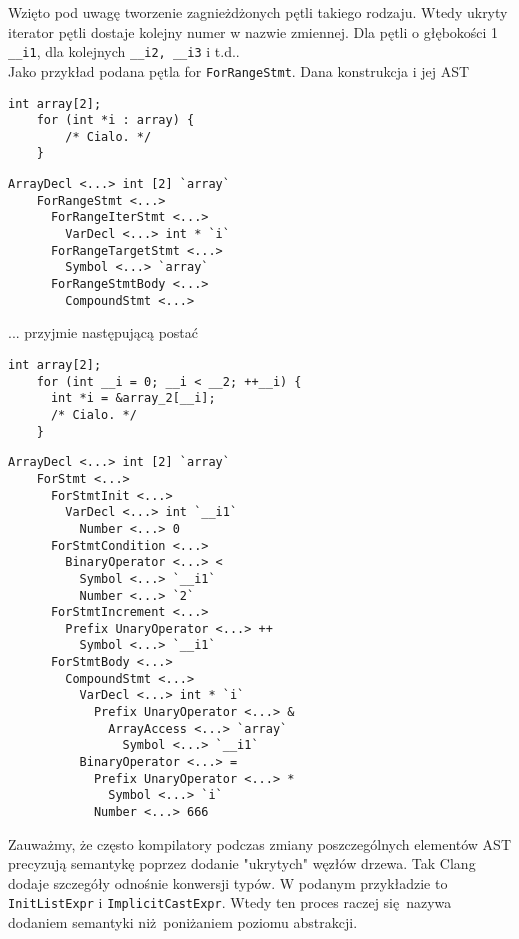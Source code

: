 			Wzięto pod uwagę tworzenie zagnieżdżonych pętli
			takiego rodzaju. Wtedy ukryty iterator pętli dostaje kolejny numer
			w nazwie zmiennej. Dla pętli o głębokości 1 \texttt{__i1}, dla kolejnych
			\texttt{__i2, __i3} i t.d..
			\\
			
			Jako przykład podana pętla for \texttt{ForRangeStmt}. Dana konstrukcja i jej AST

			\begin{lstlisting}[label={lst:ast-lower-before}]
	int array[2];
	for (int *i : array) {
		/* Cialo. */
	}\end{lstlisting}
		
			\begin{lstlisting}[label={lst:ast-lower-before-ast}]
	ArrayDecl <...> int [2] `array`
	ForRangeStmt <...>
	  ForRangeIterStmt <...>
	    VarDecl <...> int * `i`
	  ForRangeTargetStmt <...>
	    Symbol <...> `array`
	  ForRangeStmtBody <...>
	    CompoundStmt <...>\end{lstlisting}

		... przyjmie następującą postać

			\begin{lstlisting}[label={lst:ast-lower-before}]
	int array[2];
	for (int __i = 0; __i < __2; ++__i) {
	  int *i = &array_2[__i];
	  /* Cialo. */
	}\end{lstlisting}

			\begin{lstlisting}[label={lst:ast-lower-after-ast}]
	ArrayDecl <...> int [2] `array`
	ForStmt <...>
	  ForStmtInit <...>
	    VarDecl <...> int `__i1`
	      Number <...> 0
	  ForStmtCondition <...>
	    BinaryOperator <...> <
	      Symbol <...> `__i1`
	      Number <...> `2`
	  ForStmtIncrement <...>
	    Prefix UnaryOperator <...> ++
	      Symbol <...> `__i1`
	  ForStmtBody <...>
	    CompoundStmt <...>
	      VarDecl <...> int * `i`
	        Prefix UnaryOperator <...> &
	          ArrayAccess <...> `array`
	            Symbol <...> `__i1`
	      BinaryOperator <...> =
	        Prefix UnaryOperator <...> *
	          Symbol <...> `i`
	        Number <...> 666\end{lstlisting}
	        
	        \newpage

	        Zauważmy, że często kompilatory podczas zmiany poszczególnych elementów AST
	        precyzują semantykę poprzez dodanie "ukrytych" węzłów drzewa. Tak Clang
	        dodaje szczegóły odnośnie konwersji typów. W podanym przykładzie to
	        \texttt{InitListExpr} i \texttt{ImplicitCastExpr}. Wtedy ten proces raczej
	        się nazywa dodaniem semantyki niż poniżaniem poziomu abstrakcji.


